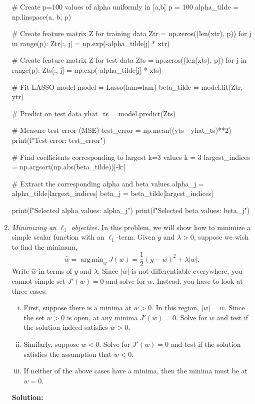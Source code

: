 \documentclass[11pt]{article}
\def\argmin{\mathop{\mathrm{arg\,min}}}
\begin{document}
\begin{enumerate}
\begin{python}
# Create p=100 values of alpha uniformly in [a,b]
p = 100
alpha_tilde = np.linspace(a, b, p)

# Create feature matrix Z for training data
Ztr = np.zeros((len(xtr), p))
for j in range(p):
    Ztr[:, j] = np.exp(-alpha_tilde[j] * xtr)

# Create feature matrix Z for test data
Zts = np.zeros((len(xts), p))
for j in range(p):
    Zts[:, j] = np.exp(-alpha_tilde[j] * xts)

# Fit LASSO model
model = Lasso(lam=lam)
beta_tilde = model.fit(Ztr, ytr)

# Predict on test data
yhat_ts = model.predict(Zts)

# Measure test error (MSE)
test_error = np.mean((yts - yhat_ts)**2)
print(f"Test error: {test_error}")

# Find coefficients corresponding to largest k=3 values
k = 3
largest_indices = np.argsort(np.abs(beta_tilde))[-k:]

# Extract the corresponding alpha and beta values
alpha_j = alpha_tilde[largest_indices]
beta_j = beta_tilde[largest_indices]

print(f"Selected alpha values: {alpha_j}")
print(f"Selected beta values: {beta_j}")
\end{python}


\item \emph{Minimizing an $\ell_1$ objective.}
In this problem, we will show how to minimize a simple scalar function with
an $\ell_1$-term.  Given $y$ and $\lambda > 0$, suppose we wish to find the minimum,
\[
    \widehat{w} = \argmin_w J(w) = \frac{1}{2}(y-w)^2 + \lambda|w|.
\]
Write $\widehat{w}$ in terms of $y$ and $\lambda$.  Since $|w|$ is not
differentiable everywhere, you cannot simple set $J'(w)=0$ and solve for $w$.
Instead, you have to look at three cases:
\begin{enumerate}[(i)]
  \item First, suppose there is a minima at $w > 0$.  In this region, $|w| = w$.
  Since the set $w > 0$ is open, at any minima $J'(w)=0$. Solve for $w$ and
  test if the solution indeed satisfies $w > 0$.
  \item Similarly, suppose $w < 0$. Solve for $J'(w) = 0$ and test if the solution
  satisfies the assumption that $w < 0$.
  \item If neither of the above cases have a minima, then the minima must be at
  $w=0$.
\end{enumerate}

\textbf{Solution:}


\end{enumerate}
\end{document}
